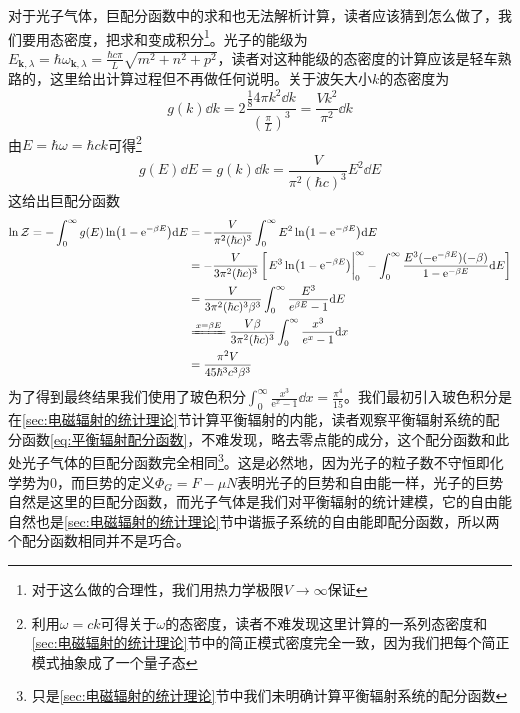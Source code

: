 \documentclass[../../main.tex]{subfiles}
\begin{document}
对于光子气体，巨配分函数中的求和也无法解析计算，读者应该猜到怎么做了，我们要用态密度，把求和变成积分\footnote{对于这么做的合理性，我们用热力学极限\(V\to\infty\)保证}。光子的能级为\(E_{\bm{k},\lambda}=\hbar\omega_{\bm{k},\lambda}=\frac{\hbar c\pi}{L}\sqrt{m^2+n^2+p^2}\)，读者对这种能级的态密度的计算应该是轻车熟路的，这里给出计算过程但不再做任何说明。关于波矢大小\(k\)的态密度为
\begin{equation}
    g(k)\dd k=2\frac{\frac{1}{8}4\pi k^2\dd k}{\left(\frac{\pi}{L}\right)^3}=\frac{Vk^2}{\pi^2}\dd k
\end{equation}
由\(E=\hbar\omega=\hbar ck\)可得\footnote{利用\(\omega=ck\)可得关于\(\omega\)的态密度，读者不难发现这里计算的一系列态密度和\ref{sec:电磁辐射的统计理论}节中的简正模式密度完全一致，因为我们把每个简正模式抽象成了一个量子态}
\begin{equation}
    g(E)\dd E=g(k)\dd k=\frac{V}{\pi^2(\hbar c)^3}E^2\dd E
\end{equation}
这给出巨配分函数
\begin{equation}
    \begin{split}
        \ln\mathcal{Z}=-\int_0^{\infty}g(E)\ln(1-\e^{-\beta E})\dd E &=-\frac{V}{\pi^2(\hbar c)^3}\int_0^{\infty}E^2\ln(1-\e^{-\beta E})\dd E \\
        &=-\frac{V}{3\pi^2(\hbar c)^3}\left[\eval{E^3\ln(1-\e^{-\beta E})}_{0}^{\infty}-\int_0^{\infty}\frac{E^3(-\e^{-\beta E})(-\beta)}{1-\e^{-\beta E}}\dd E\right] \\
        &=\frac{V}{3\pi^2(\hbar c)^3\beta^3}\int_0^{\infty}\frac{E^3}{e^{\beta E}-1}\dd E \\
        & \xlongequal{x=\beta E}\frac{V\beta}{3\pi^2(\hbar c)^3}\int_0^{\infty}\frac{x^3}{e^{x}-1}\dd x \\
        &=\frac{\pi^2V}{45\hbar^3c^3\beta^3}
    \end{split}
\end{equation}
为了得到最终结果我们使用了玻色积分\(\int_0^{\infty}\frac{x^3}{\mathrm{e}^x-1}\dd x=\frac{\pi^4}{15}\)。我们最初引入玻色积分是在\ref{sec:电磁辐射的统计理论}节计算平衡辐射的内能，读者观察平衡辐射系统的配分函数\eqref{eq:平衡辐射配分函数}，不难发现，略去零点能的成分，这个配分函数和此处光子气体的巨配分函数完全相同\footnote{只是\ref{sec:电磁辐射的统计理论}节中我们未明确计算平衡辐射系统的配分函数}。这是必然地，因为光子的粒子数不守恒即化学势为0，而巨势的定义\(\Phi_{G}=F-\mu N\)表明光子的巨势和自由能一样，光子的巨势自然是这里的巨配分函数，而光子气体是我们对平衡辐射的统计建模，它的自由能自然也是\ref{sec:电磁辐射的统计理论}节中谐振子系统的自由能即配分函数，所以两个配分函数相同并不是巧合。
\end{document}
